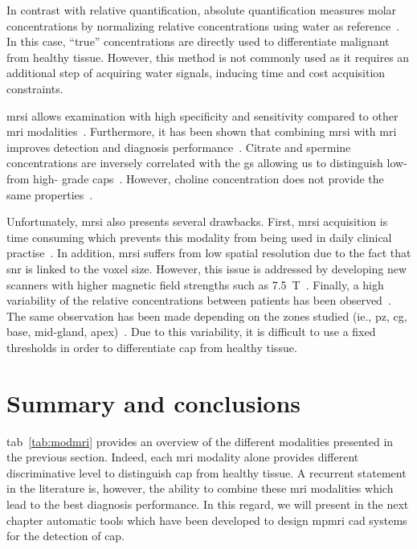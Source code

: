 In contrast with relative quantification, absolute quantification measures molar concentrations by normalizing relative concentrations using water as reference~\cite{Lemaitre2011}.
In this case, ``true'' concentrations are directly used to differentiate malignant from healthy tissue.
However, this method is not commonly used as it requires an additional step of acquiring water signals, inducing time and cost acquisition constraints.

\ac{mrsi} allows examination with high specificity and sensitivity compared to other \ac{mri} modalities~\cite{Choi2007}.
Furthermore, it has been shown that combining \ac{mrsi} with \ac{mri} improves detection and diagnosis performance~\cite{Scheidler1999a,Kaji1998,Vilanova2009}.
Citrate and spermine concentrations are inversely correlated with the \ac{gs} allowing us to distinguish low- from high- grade \acp{cap}~\cite{Giskeodegard2013}.
However, choline concentration does not provide the same properties~\cite{Giskeodegard2013}.

Unfortunately, \ac{mrsi} also presents several drawbacks.
First, \ac{mrsi} acquisition is time consuming which prevents this modality from being used in daily clinical practise~\cite{Barentsz2012}.
In addition, \ac{mrsi} suffers from low spatial resolution due to the fact that \ac{snr} is linked to the voxel size.
However, this issue is addressed by developing new scanners with higher magnetic field strengths such as \SI{7.5}{\tesla}~\cite{Giskeodegard2013}.
Finally, a high variability of the relative concentrations between patients has been observed~\cite{Choi2007}.
The same observation has been made depending on the zones studied (ie., \ac{pz}, \ac{cg}, base, mid-gland, apex)~\cite{Walker2010,Lemaitre2011}.
Due to this variability, it is difficult to use a fixed thresholds in order to differentiate \ac{cap} from healthy tissue.

\section{Summary and conclusions}

\acs{tab}~\ref{tab:modmri} provides an overview of the different modalities presented in the previous section.
Indeed, each \ac{mri} modality alone provides different discriminative level to distinguish \ac{cap} from healthy tissue.
A recurrent statement in the literature is, however, the ability to combine these \ac{mri} modalities which lead to the best diagnosis performance.
In this regard, we will present in the next chapter automatic tools which have been developed to design \ac{mpmri} \ac{cad} systems for the detection of \ac{cap}.


